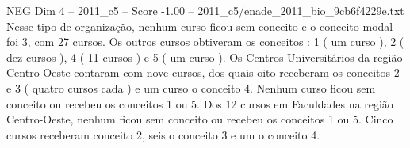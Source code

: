 \begin{textsample}{NEG Dim 4 – 2011\_c5 – Score -1.00 – 2011\_c5/enade\_2011\_bio\_9cb6f4229e.txt}
Nesse tipo de organização, nenhum curso ficou sem conceito e o conceito modal foi 3, com 27 cursos.
Os outros cursos obtiveram os conceitos : 1 ( um curso ), 2 ( dez cursos ), 4 ( 11 cursos ) e 5 ( um curso ).
Os Centros Universitários da região Centro-Oeste contaram com nove cursos, dos quais oito receberam os conceitos 2 e 3 ( quatro cursos cada ) e um curso o conceito 4.
Nenhum curso ficou sem conceito ou recebeu os conceitos 1 ou 5.
Dos 12 cursos em Faculdades na região Centro-Oeste, nenhum ficou sem conceito ou recebeu os conceitos 1 ou 5.
Cinco cursos receberam conceito 2, seis o conceito 3 e um o conceito 4.

\end{textsample}
